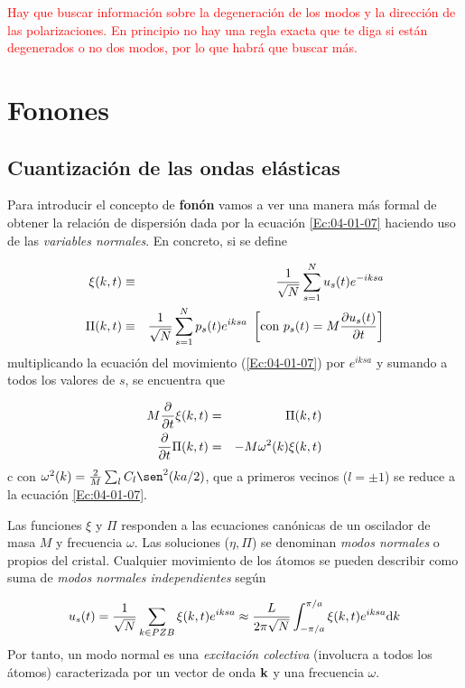 \begin{Anotacion}
	\textcolor{red}{Hay que buscar información sobre la degeneración de los modos y la dirección de las polarizaciones. En principio no hay una regla exacta que te diga si están degenerados o no dos modos, por lo que habrá que buscar más.}	
\end{Anotacion}

\section{Fonones}

\subsection{Cuantización de las ondas elásticas}

Para introducir el concepto de \textbf{fonón} vamos a ver una manera más formal de obtener la relación de dispersión dada por la ecuación \ref{Ec:04-01-07} haciendo uso de las \textit{variables normales}. En concreto, si se define 

\begin{eqnarray}
    \xi (k,t) & \equiv & \frac{1}{\sqrt{N}} \sum_{s=1}^N u_s (t) e^{-iksa} \\
    \Pi (k,t) & \equiv & \frac{1}{\sqrt{N}} \sum_{s=1}^N p_s (t) e^{iksa} \ \left[ \text{con} \ p_s (t) = M \frac{\partial u_s(t)}{\partial t} \right]
\end{eqnarray}
multiplicando la ecuación del movimiento (\ref{Ec:04-01-07}) por $e^{iksa}$ y sumando a todos los valores de $s$, se encuentra que

\begin{eqnarray}
    M \frac{\partial }{\partial t} \xi (k,t) & = & \Pi (k,t) \\
    \frac{\partial }{\partial t} \Pi (k,t) & =  & - M \omega^2 (k) \xi (k,t)    
\end{eqnarray}c
con $\omega^2 (k) = \frac{2}{M} \sum_l C_l \sen^2 ( ka/2)$, que a primeros vecinos ($l=\pm 1$) se reduce a la ecuación \ref{Ec:04-01-07}.

Las funciones $\xi$ y $\Pi$ responden a las ecuaciones canónicas de un oscilador de masa $M$ y frecuencia $\omega$. Las soluciones ($\eta,\Pi$) se denominan \textit{modos normales} o propios del cristal. Cualquier movimiento de los átomos se pueden describir como suma de \textit{modos normales independientes} según

\begin{equation}
    u_s (t) = \frac{1}{\sqrt{N}} \sum_{k \in PZB} \xi (k,t) e^{iksa} \approx \frac{L}{2\pi \sqrt{N}} \int_{-\pi/a}^{\pi/a} \xi (k,t) e^{iksa} \mathrm{d} k
\end{equation}
Por tanto, un modo normal es una \textit{excitación colectiva} (involucra a todos los átomos) caracterizada por un vector de onda $\mathbf{k}$ y una frecuencia $\omega$. 

